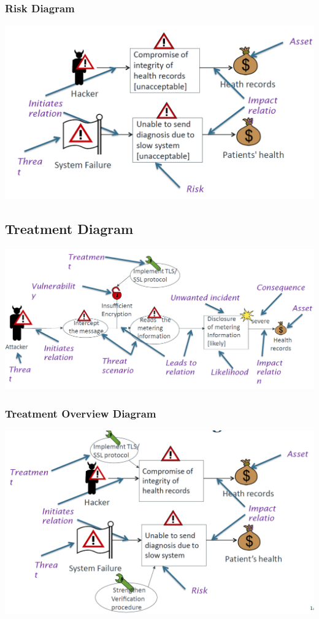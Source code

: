 \documentclass[10pt,a4paper,final]{report}
\begin{document}
\subsubsection{Risk Diagram}
\includegraphics[scale=.4]{RiskDiagram.png}
\subsection{Treatment Diagram}
\includegraphics[scale=.4]{TreatmentDiagram.png}
\subsubsection{Treatment Overview Diagram}
\includegraphics[scale=.4]{OverviewDiagram.png}
\end{document}
